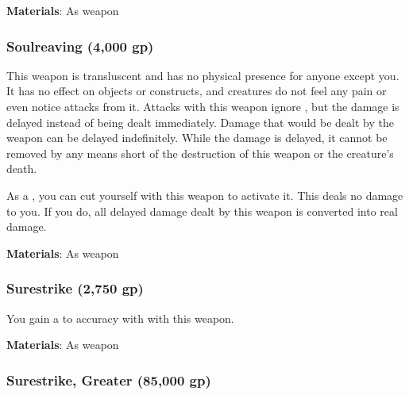 \vspace{0.25em}
\textbf{Materials}: As weapon


\lowercase{\hypertarget{item:Soulreaving}{}}\label{item:Soulreaving}
\hypertarget{item:Soulreaving}{\subsubsection{Soulreaving\hfill{} (4,000 gp)}}

This weapon is transluscent and has no physical presence for anyone except you.
It has no effect on objects or constructs, and creatures do not feel any pain or even notice attacks from it.
Attacks with this weapon ignore , but the damage is delayed instead of being dealt immediately.
Damage that would be dealt by the weapon can be delayed indefinitely.
While the damage is delayed, it cannot be removed by any means short of the destruction of this weapon or the creature's death.

As a , you can cut yourself with this weapon to activate it.
This deals no damage to you.
If you do, all delayed damage dealt by this weapon is converted into real damage.



\vspace{0.25em}
\textbf{Materials}: As weapon


\lowercase{\hypertarget{item:Surestrike}{}}\label{item:Surestrike}
\hypertarget{item:Surestrike}{\subsubsection{Surestrike\hfill{} (2,750 gp)}}

You gain a   to accuracy with  with this weapon.



\vspace{0.25em}
\textbf{Materials}: As weapon


\lowercase{\hypertarget{item:Surestrike, Greater}{}}\label{item:Surestrike, Greater}
\hypertarget{item:Surestrike, Greater}{\subsubsection{Surestrike, Greater\hfill{} (85,000 gp)}}

